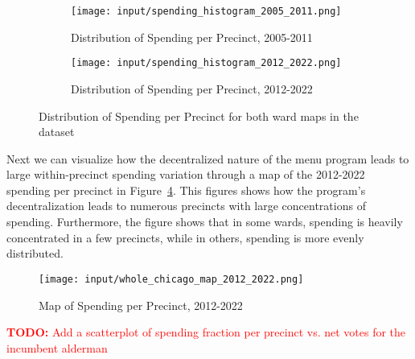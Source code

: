 \begin{figure}[H]
    \centering
    \begin{subfigure}[b]{0.45\textwidth} %
      \texttt{[image: input/spending\_histogram\_2005\_2011.png]}
      \caption{Distribution of Spending per Precinct, 2005-2011}
      \label{fig:sub1}
    \end{subfigure}
    \hfill %
    \begin{subfigure}[b]{0.45\textwidth}
      \texttt{[image: input/spending\_histogram\_2012\_2022.png]}
      \caption{Distribution of Spending per Precinct, 2012-2022}
      \label{fig:sub2}
    \end{subfigure}
  
    \caption{Distribution of Spending per Precinct for both ward maps in the dataset}
    \label{fig:spending_hist}
  \end{figure}

Next we can visualize how the decentralized nature of the menu program leads to large within-precinct spending variation through a map of the 2012-2022 spending per precinct in Figure~\ref{fig:spending_map}.
This figures shows how the program's decentralization leads to numerous precincts with large concentrations of spending.
Furthermore, the figure shows that in some wards, spending is heavily concentrated in a few precincts, while in others, spending is more evenly distributed.

\begin{figure}[H]
    \centering
    \texttt{[image: input/whole\_chicago\_map\_2012\_2022.png]}
    \caption{Map of Spending per Precinct, 2012-2022}
    \label{fig:spending_map}
\end{figure}

\textcolor{red}{\textbf{TODO:} Add a scatterplot of spending fraction per precinct vs. net votes for the incumbent alderman}